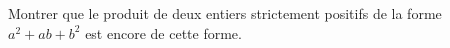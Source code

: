 Montrer que le produit de deux entiers strictement positifs de la forme $a^2 + ab + b^2$ est encore de cette forme.
